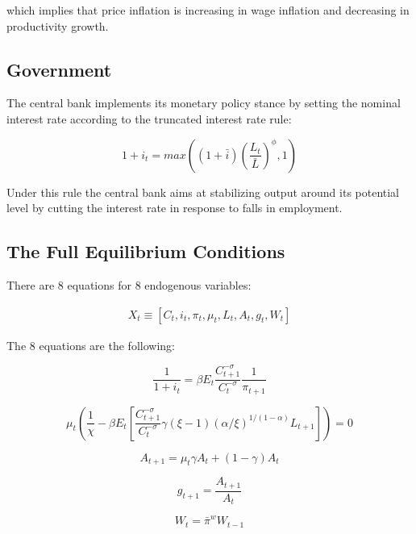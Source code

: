 \documentclass[cn,10pt,math=newtx,citestyle=gb7714-2015,bibstyle=gb7714-2015]{elegantbook}
\begin{document}
{{	which implies that price inflation is increasing in wage inflation and decreasing in productivity growth.
	
	\subsection{Government}
	
	The central bank implements its monetary policy stance by setting the nominal interest rate according to the truncated interest rate rule:
	
	\begin{equation}
		1+i_t = max \left((1+\bar{i})\left(\frac{L_t}{\bar{L}}\right)^\phi,1\right)
	\end{equation}
	
	Under this rule the central bank aims at stabilizing output around its potential level by cutting the interest rate in response to falls in employment.
	
	\subsection{The Full Equilibrium Conditions}
	
	There are 8 equations for 8 endogenous variables:
	
	$$
	\begin{aligned}
		X_{t} \equiv \left[C_t, i_t, \pi_t, \mu_t, L_t, A_t, g_t, W_t\right]
	\end{aligned}
	$$
	
	The 8 equations are the following:

	\begin{equation}
		\frac{1}{1+i_t} = \beta E_t \frac{C_{t+1}^{-\sigma}}{C_{t}^{-\sigma}}\frac{1}{\pi_{t+1}}
	\end{equation}
	
	\begin{equation}
		\mu_{t}\left(\frac{1}{\chi}-\beta E_{t}\left[\frac{C_{t+1}^{-\sigma}}{C_{t}^{-\sigma}} \gamma (\xi-1)(\alpha / \xi)^{1 /(1-\alpha)} L_{t+1}\right]\right)=0
	\end{equation}
	
	\begin{equation}
A_{t+1} = \mu_t\gamma A_t+(1-\gamma)A_t
	\end{equation}

	
	\begin{equation}
		g_{t+1}=\frac{A_{t+1}}{A_t}
	\end{equation}
	
		\begin{equation}
		W_t = \bar{\pi}^w W_{t-1}
	\end{equation}
	
}}
\end{document}
